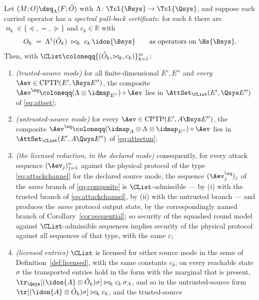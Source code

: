 \begin{theorem}\label{thm:licence}
Let $(M;O)\dsq_{\Lambda}(F;\hat O)$ with $\Lambda\colon\Tcl{\Bsys}\to
\Tcl{\Qsys}$, and suppose each carried operator has a \emph{spectral pull-back
certificate}: for each $k$ there are $\bowtie_k\in\{\preceq,=,\succeq\}$ and
$c_k\in\mathbb{R}$ with
\begin{equation}\label{eq:certificate}
  O_k\;=\;\Lambda^{\dagger}(\hat O_k)\;\bowtie_k\;c_k\,\idon{\Bsys}
  \qquad\text{as operators on }\Hs{\Bsys}.
\end{equation}
Then, with $\CList\coloneqq\{(\hat O_k,\bowtie_k,c_k)\}_{k=1}^{m}$:
\begin{enumerate}[label=(\roman*),leftmargin=3.0em]
\item \emph{(trusted-source mode)} for all finite-dimensional $E',E''$ and
  \emph{every} $\Aev\in\mathrm{CPTP}(E',\Bsys E'')$, the composite
  $\Aev^{\sq}\coloneqq(\Lambda\otimes\idmap_{E''})\circ\Aev$ lies in
  $\AttSet_{\CList}(E',\Qsys E'')$ of \eqref{eq:attset};
\item \emph{(untrusted-source mode)} for every
  $\Aev\in\mathrm{CPTP}(E',A\Bsys E'')$, the composite
  $\Aev^{\sq}\coloneqq(\idmap_A\otimes\Lambda\otimes\idmap_{E''})\circ\Aev$
  lies in $\AttSet_{\CList}(E',A\Qsys E'')$ of \eqref{eq:attsetun};
\item \emph{(the licensed reduction, in the declared mode)} consequently, for
  every attack sequence $(\Aev_j)_{j=1}^{n}$ against the physical protocol of
  the type \eqref{eq:attackchannel} for the declared source mode, the sequence
  $(\Aev^{\sq}_j)_j$ of the \emph{same} branch of \eqref{eq:composite} is
  $\CList$-admissible --- by (i) with the trusted branch of
  \eqref{eq:attackchannel}, by (ii) with the untrusted branch --- and produces
  the \emph{same} protocol output state, by the correspondingly named branch of
  Corollary~\ref{cor:sequential}; so security of the squashed round model
  against $\CList$-admissible sequences implies security of the physical
  protocol against all sequences of that type, with the same $\varepsilon$;
\item \emph{(licensed entries)} $\CList$ is licensed for either source mode in
  the sense of Definition~\ref{def:licensed}, with the same constants $c_k$;
  on every reachable state $\sigma$ the transported entries hold in the form
  with the marginal that is present,
  $\tr_{\Qsys}[(\idon{A}\otimes\hat O_k)\sigma]\bowtie_kc_k\,\sigma_A$, and
  so in the untrusted-source form
  $\tr[(\idon{A}\otimes\hat O_k)\sigma]\bowtie_kc_k$; and the trusted-source

\end{enumerate}
\end{theorem}
